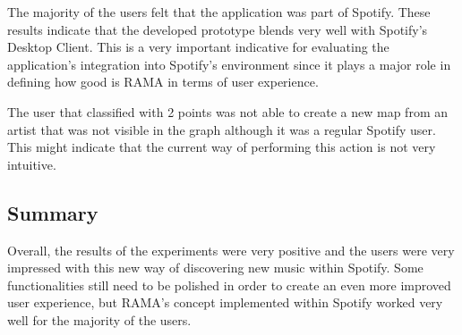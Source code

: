       The majority of the users felt that the application was part of Spotify.
      These results indicate that the developed prototype blends very well with Spotify's Desktop Client.
      This is a very important indicative for evaluating the application's integration into Spotify's environment since it plays a major role in defining how good is RAMA in terms of user experience.

      The user that classified with 2 points was not able to create a new map from an artist that was not visible in the graph although it was a regular Spotify user.
      This might indicate that the current way of performing this action is not very intuitive.
  

  \subsection{Summary}

    Overall, the results of the experiments were very positive and the users were very impressed with this new way of discovering new music within Spotify.
    Some functionalities still need to be polished in order to create an even more improved user experience, but RAMA's concept implemented within Spotify worked very well for the majority of the users.
  
